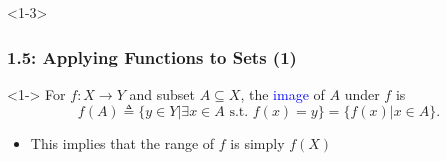 \documentclass[10pt,english,aspectratio=169]{beamer}
\begin{document}
\begin{frame}<1-3> \frametitle{1.5: Applying Functions to Sets (1)}

\vspace{1mm}
\begin{definition}<1->
For $f \colon X\rightarrow Y$ and subset $A\subseteq X$, the \textcolor{blue}{image} of $A$ under $f$ is \vspace{-2mm}
\[ f(A) \triangleq \{ y\in Y | \exists x\in A \textrm{ s.t. } f(x)=y\} = \{f(x) | x\in A\}. \]
\end{definition}

\begin{center}
\end{center}

\begin{itemize}
  \setlength\itemsep{2mm}
  \item<3-> This implies that the range of $f$ is simply $f(X)$
\end{itemize}


\end{frame}  
\end{document}
